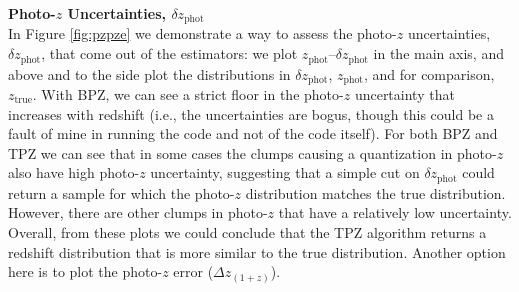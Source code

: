 \documentclass[DM,lsstdraft,toc]{lsstdoc}
\begin{document}
\smallskip \noindent \textbf{Photo-$z$ Uncertainties, $\delta z_\mathrm{phot}$} \\
In Figure \ref{fig:pzpze} we demonstrate a way to assess the photo-$z$ uncertainties, $\delta z_\mathrm{phot}$, that come out of the estimators: we plot $z_\mathrm{phot}$--$\delta z_\mathrm{phot}$ in the main axis, and above and to the side plot the distributions in $\delta z_\mathrm{phot}$, $z_\mathrm{phot}$, and for comparison, $z_\mathrm{true}$. With BPZ, we can see a strict floor in the photo-$z$ uncertainty that increases with redshift (i.e., the uncertainties are bogus, though this could be a fault of mine in running the code and not of the code itself). For both BPZ and TPZ we can see that in some cases the clumps causing a quantization in photo-$z$ also have high photo-$z$ uncertainty, suggesting that a simple cut on $\delta z_\mathrm{phot}$ could return a sample for which the photo-$z$ distribution matches the true distribution. However, there are other clumps in photo-$z$ that have a relatively low uncertainty. Overall, from these plots we could conclude that the TPZ algorithm returns a redshift distribution that is more similar to the true distribution. Another option here is to plot the photo-$z$ error ($\Delta z_{(1+z)}$).
\end{document}
